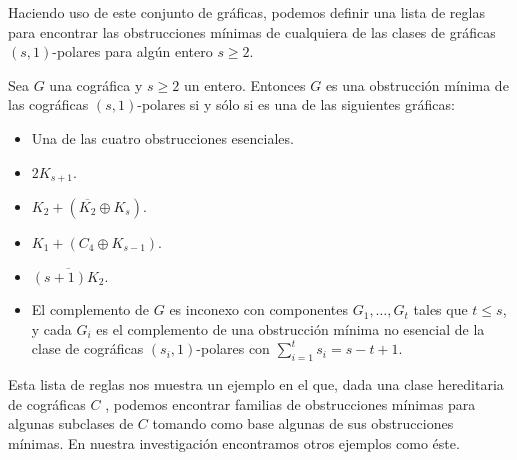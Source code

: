 Haciendo uso de este conjunto de gráficas, podemos definir una lista de reglas para encontrar las obstrucciones mínimas de cualquiera de las clases de gráficas $(s,1)$-polares para algún entero $s \geq 2$.

\begin{theorem}
    Sea $G$ una cográfica y $s \geq 2$ un entero. Entonces $G$ es una obstrucción mínima de las cográficas $(s,1)$-polares si y sólo si es una de las siguientes gráficas:
    
    \begin{itemize}
        \item Una de las cuatro obstrucciones esenciales.
        \item $2K_{s+1}$.
        \item $K_2 + (\overline{K_2}\oplus K_s)$.
        \item $K_1 + (C_4 \oplus K_{s-1})$.
        \item $\overline{(s+1)K_2}$.
        \item El complemento de $G$ es inconexo con componentes $G_1, \dots, G_t$ tales que $t \leq s$, y cada $G_i$ es el complemento de una obstrucción mínima no esencial de la clase de cográficas $(s_i, 1)$-polares con $\sum^{t}_{i=1}s_i = s-t+1$.
    \end{itemize}
    
\end{theorem}

Esta lista de reglas nos muestra un ejemplo en el que, dada una clase hereditaria de cográficas $C$ , podemos encontrar familias de obstrucciones mínimas para algunas subclases de $C$ tomando como base algunas de sus obstrucciones mínimas. En nuestra investigación encontramos otros ejemplos como éste. 
